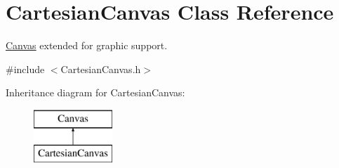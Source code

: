 \hypertarget{class_cartesian_canvas}{\section{Cartesian\+Canvas Class Reference}
\label{class_cartesian_canvas}
}


\hyperlink{class_canvas}{Canvas} extended for graphic support.  




{\ttfamily \#include $<$Cartesian\+Canvas.\+h$>$}

Inheritance diagram for Cartesian\+Canvas\+:\begin{figure}[H]
\begin{center}
\leavevmode
\includegraphics[height=2.000000cm]{class_cartesian_canvas}
\end{center}
\end{figure}
